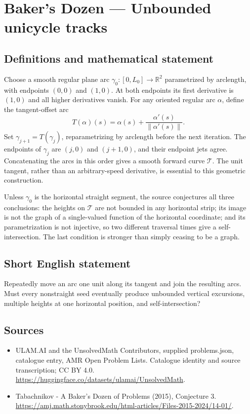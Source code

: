 \documentclass[11pt,a4paper]{article}
\begin{document}
\section*{Baker's Dozen — Unbounded unicycle tracks}\label{statement}

\subsection{Definitions and mathematical statement}
Choose a smooth regular plane arc $\gamma_0:[0,L_0]\to\mathbb R^2$ parametrized
by arclength, with endpoints $(0,0)$ and $(1,0)$. At both endpoints its first
derivative is $(1,0)$ and all higher derivatives vanish. For any oriented
regular arc $\alpha$, define the tangent-offset arc
\[
 T(\alpha)(s)=\alpha(s)+\frac{\alpha'(s)}{\|\alpha'(s)\|}.
\]
Set $\gamma_{j+1}=T(\gamma_j)$, reparametrizing by arclength before the next
iteration. The endpoints of $\gamma_j$ are $(j,0)$ and $(j+1,0)$, and their
endpoint jets agree. Concatenating the arcs in this order gives a smooth
forward curve $\mathcal T$. The unit tangent, rather than an arbitrary-speed
derivative, is essential to this geometric construction.

Unless $\gamma_0$ is the horizontal straight segment, the source conjectures
all three conclusions: the heights on $\mathcal T$ are not bounded in any
horizontal strip; its image is not the graph of a single-valued function of
the horizontal coordinate; and its parametrization is not injective, so two
different traversal times give a self-intersection. The last condition is
stronger than simply ceasing to be a graph.
\subsection{Short English statement}
Repeatedly move an arc one unit along its tangent and join the resulting
arcs. Must every nonstraight seed eventually produce unbounded vertical
excursions, multiple heights at one horizontal position, and self-intersection?
\subsection{Sources}
\begin{itemize}
\item[S1] ULAM.AI and the UnsolvedMath Contributors, supplied problems.json, catalogue entry, AMR Open Problem Lists. Catalogue identity and source transcription; CC BY 4.0.
\url{https://huggingface.co/datasets/ulamai/UnsolvedMath}.
\item[S2] Tabachnikov - A Baker's Dozen of Problems (2015), Conjecture 3. 
\url{https://amj.math.stonybrook.edu/html-articles/Files-2015-2024/14-01/}.
\end{itemize}
\end{document}

